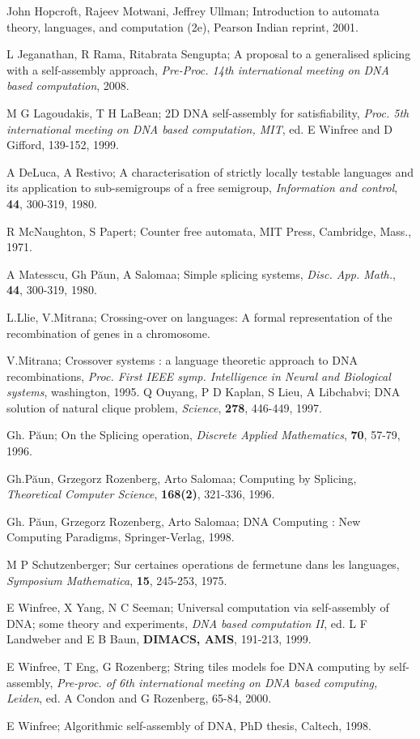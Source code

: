 \documentclass{llncs}
\begin{document}
\begin{thebibliography}{9}
 John Hopcroft, Rajeev Motwani, Jeffrey Ullman; Introduction to automata theory, languages, and computation (2e),
Pearson Indian reprint, 2001.

  L Jeganathan, R Rama, Ritabrata Sengupta; A proposal to a generalised splicing with a  self-assembly approach, {\itshape Pre-Proc. 14th international meeting on DNA based computation}, 2008.

M G Lagoudakis, T H LaBean; 2D DNA self-assembly for satisfiability, {\itshape Proc. 5th international meeting on DNA based computation, MIT}, ed. E Winfree and D Gifford, 139-152, 1999.


 A DeLuca, A Restivo; A characterisation of strictly locally testable languages and its application to sub-semigroups of a free semigroup, {\itshape Information and control}, {\bfseries 44},  300-319, 1980.


  R McNaughton, S Papert; Counter free automata, MIT Press, Cambridge, Mass., 1971.

 A Matesscu, Gh P\u aun, A Salomaa; Simple splicing systems, {\itshape Disc. App. Math.}, {\bfseries 44},  300-319, 1980.

L.Llie, V.Mitrana; Crossing-over on languages: A
formal representation of the recombination of genes in a chromosome.

 V.Mitrana; Crossover systems : a language theoretic approach to
DNA recombinations, {\itshape Proc. First IEEE symp. Intelligence in
Neural and Biological systems}, washington, 1995.
 Q Ouyang, P D Kaplan, S Lieu, A Libchabvi; DNA solution of natural clique problem, {\itshape Science}, {\bfseries 278},  446-449, 1997.

Gh. P\u aun;  On the Splicing operation, {\itshape Discrete Applied Mathematics}, {\bfseries 70},  57-79, 1996.

Gh.P\u aun, Grzegorz Rozenberg, Arto Salomaa; Computing by
Splicing, {\itshape Theoretical Computer Science}, {\bfseries 168(2)}, 321-336, 1996.



Gh. P\u aun, Grzegorz Rozenberg, Arto Salomaa;  DNA Computing : New Computing Paradigms, Springer-Verlag, 1998.

 M P Schutzenberger; Sur certaines operations de fermetune dans les languages, {\itshape Symposium Mathematica}, {\bfseries 15}, 245-253, 1975.

   E Winfree, X Yang, N C Seeman; Universal computation via self-assembly of DNA; some theory and experiments, {\itshape DNA based computation II}, ed. L F Landweber and E B Baun, {\bfseries DIMACS, AMS},  191-213, 1999.

   E Winfree, T Eng, G Rozenberg; String tiles models foe DNA computing by self-assembly, {\itshape Pre-proc. of 6th international meeting on DNA based computing, Leiden}, ed. A Condon and G Rozenberg, 65-84, 2000.

 E Winfree; Algorithmic self-assembly of DNA, PhD thesis, Caltech, 1998.

\end{thebibliography}
 
\end{document}
